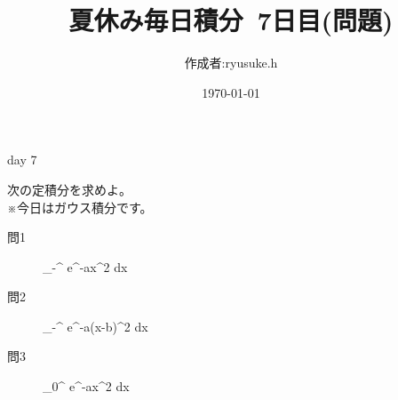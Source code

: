 \documentclass[12pt,a4paper]{jsarticle}
\title{夏休み毎日積分~7日目(問題)}
\date{\today}
\begin{document}
\maketitle
\begin{flushright}
    \author{作成者:ryusuke.h}
\end{flushright}
\begin{itembox}[c]{day 7 }
    \begin{center}
        次の定積分を求めよ。\\
        ※今日はガウス積分です。
    \end{center}
\end{itembox}

\begin{description}
    \item [問1] {\displaystyle} \int_{-\infty}^{\infty} e^{-ax^2} dx
\end{description}

\begin{description}
    \item [問2] {\displaystyle} \int_{-\infty}^{\infty} e^{-a(x-b)^2} dx
\end{description}

\begin{description}
    \item [問3] {\displaystyle} \int_0^{\infty} e^{-ax^2} dx
\end{description}
\end{document}
